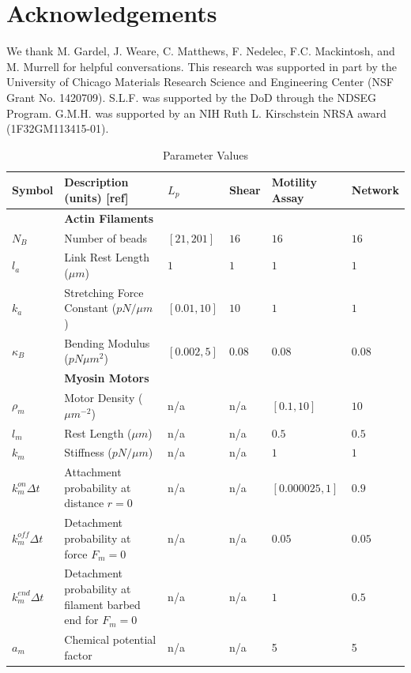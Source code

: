 \documentclass[12pt]{article}
\newcommand{\beginsupplement}{%
  \setcounter{table}{0}
  \renewcommand{\thetable}{S\arabic{table}}%
  \setcounter{figure}{0}
  \renewcommand{\thefigure}{S\arabic{figure}}%
}
\begin{document}
\section{Acknowledgements}  
We thank M. Gardel, J. Weare, C. Matthews, F. Nedelec, F.C. Mackintosh, and M. Murrell for helpful conversations. 
This research was supported in part by the
University of Chicago Materials Research Science and Engineering Center
(NSF Grant No. 1420709). S.L.F. was supported by the DoD
through the NDSEG Program. G.M.H. was supported by an NIH Ruth L. Kirschstein
NRSA award (1F32GM113415-01).



\beginsupplement
\begin{table}
  \caption{Parameter Values}
  \centering
  \begin{tabular}{|C{1.5cm}|L{7cm}|C{1.5cm}|C{1.5cm}|C{2cm}|C{1.5cm}|}
    \hline\hline
    Symbol & Description (units) [ref] & $L_p$ & Shear & Motility Assay & Network \\
    \hline
    &\bf{Actin Filaments}& & & &\\
    \hline
    $N_B$ & Number of beads & $[21,201]$ & $16$ & $16$ & $16$\\
    $l_a$ & Link Rest Length ($\mu m$)\cite{odijk1983}& $1$ & $1$ & $1$ & $1$\\
    $k_a$ & Stretching Force Constant ($pN/\mu m$) & $[0.01,10]$ & $10$ & $1$ &$1$\\
    $\kappa_B$ & Bending Modulus ($pN\mu m^2$)\cite{ott1993} & $[0.002,5] $ & $0.08$ & $0.08$ &$0.08$\\
    \hline
    &\bf{Myosin Motors}& & & &\\
    \hline
    $\rho_m$ & Motor Density ($\mu m^{-2}$) & n/a & n/a & $[0.1,10]$ & $10$ \\
    $l_m$ & Rest Length ($\mu m$)\cite{niederman1975} & n/a & n/a & $0.5$ & $0.5$ \\
    $k_m$ & Stiffness ($pN/\mu m$)& n/a & n/a & $1$ & $1$\\
    $k^{on}_m\Delta t$ & Attachment probability at distance $r=0$& n/a & n/a &$[0.000025, 1]$ & $0.9$\\
    $k^{off}_m\Delta t$ & Detachment probability at force $F_{m}=0$& n/a & n/a & $0.05$ & $0.05$\\
    $k^{end}_m\Delta t$ & Detachment probability at filament barbed end for $F_m=0$ & n/a & n/a & $1$ & $0.5$ \\
    $a_m$ & Chemical potential factor& n/a & n/a & 5 & 5\\

\end{tabular}
\end{table}
\end{document}
